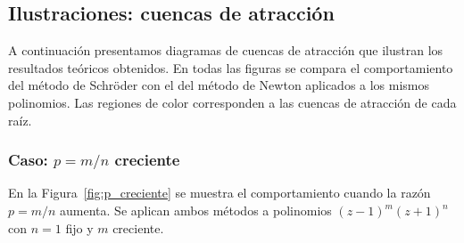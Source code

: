 \subsection{Ilustraciones: cuencas de atracción}

A continuación presentamos diagramas de cuencas de atracción que ilustran los resultados teóricos obtenidos. En todas las figuras se compara el comportamiento del método de Schröder con el del método de Newton aplicados a los mismos polinomios. Las regiones de color corresponden a las cuencas de atracción de cada raíz.

\subsubsection{Caso: $p=m/n$ creciente}

En la Figura~\ref{fig:p_creciente} se muestra el comportamiento cuando la razón $p=m/n$ aumenta. Se aplican ambos métodos a polinomios $(z-1)^m(z+1)^n$ con $n=1$ fijo y $m$ creciente.


